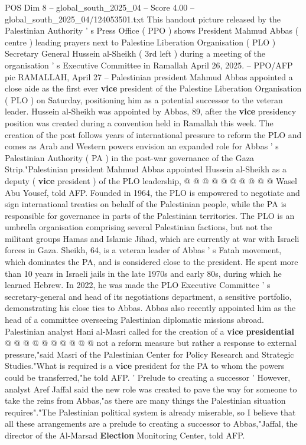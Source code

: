 \begin{textsample}{POS Dim 8 – global\_south\_2025\_04 – Score 4.00 – global\_south\_2025\_04/124053501.txt}  \label{ex:f8_pos_414}
This handout picture released by the Palestinian Authority ' s Press Office ( PPO ) shows President Mahmud Abbas ( centre ) leading prayers next to Palestine Liberation Organisation ( PLO ) Secretary General Hussein al-Sheikh ( 3rd left ) during a meeting of the organisation ' s Executive Committee in Ramallah April 26, 2025. -- PPO/AFP pic RAMALLAH, April 27 -- Palestinian president Mahmud Abbas appointed a close aide as the first ever \textbf{vice} president of the Palestine Liberation Organisation ( PLO ) on Saturday, positioning him as a potential successor to the veteran leader.
Hussein al-Sheikh was appointed by Abbas, 89, after the \textbf{vice} presidency position was created during a convention held in Ramallah this week.
The creation of the post follows years of international pressure to reform the PLO and comes as Arab and Western powers envision an expanded role for Abbas ' s Palestinian Authority ( PA ) in the post-war governance of the Gaza Strip."Palestinian president Mahmud Abbas appointed Hussein al-Sheikh as a deputy ( \textbf{vice} president ) of the PLO leadership, @ @ @ @ @ @ @ @ @ @ Wasel Abu Yousef, told AFP.
Founded in 1964, the PLO is empowered to negotiate and sign international treaties on behalf of the Palestinian people, while the PA is responsible for governance in parts of the Palestinian territories.
The PLO is an umbrella organisation comprising several Palestinian factions, but not the militant groups Hamas and Islamic Jihad, which are currently at war with Israeli forces in Gaza.
Sheikh, 64, is a veteran leader of Abbas ' s Fatah movement, which dominates the PA, and is considered close to the president.
He spent more than 10 years in Israeli jails in the late 1970s and early 80s, during which he learned Hebrew.
In 2022, he was made the PLO Executive Committee ' s secretary-general and head of its negotiations department, a sensitive portfolio, demonstrating his close ties to Abbas.
Abbas also recently appointed him as the head of a committee overseeing Palestinian diplomatic missions abroad.
Palestinian analyst Hani al-Masri called for the creation of a \textbf{vice} \textbf{presidential} @ @ @ @ @ @ @ @ @ @ not a reform measure but rather a response to external pressure,"said Masri of the Palestinian Center for Policy Research and Strategic Studies."What is required is a \textbf{vice} president for the PA to whom the powers could be transferred,"he told AFP. ' Prelude to creating a successor ' However, analyst Aref Jaffal said the new role was created to pave the way for someone to take the reins from Abbas,"as there are many things the Palestinian situation requires"."The Palestinian political system is already miserable, so I believe that all these arrangements are a prelude to creating a successor to Abbas,"Jaffal, the director of the Al-Marsad \textbf{Election} Monitoring Center, told AFP.

\end{textsample}
